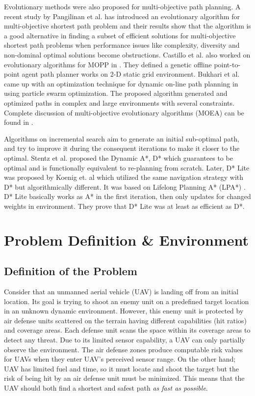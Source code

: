 \documentclass[10pt, a4paper, conference, compsocconf]{IEEEtran}
\begin{document}
Evolutionary methods were also proposed for multi-objective path planning. A recent study by Pangilinan et al. \cite{Pangilinan} has introduced an evolutionary algorithm for multi-objective shortest path problem and their results show that the algorithm is a good alternative in finding a subset of efficient solutions for multi-objective shortest path problems when performance issues like complexity, diversity and non-dominal optimal solutions become obstructions. Castillo et al. also worked on evolutionary algorithms for MOPP in \cite{Castillo:2007}. They defined a genetic offline point-to-point agent path planner works on 2-D static grid environment. Bukhari et al. came up with an optimization technique for dynamic on-line path planning in \cite{Bukhari:2010} using particle swarm optimization. The proposed algorithm generated and optimized paths in complex and large environments with several constraints. Complete discussion of multi-objective evolutionary algorithms (MOEA) can be found in \cite{MOOUEA}.

Algorithms on incremental search aim to generate an initial sub-optimal path, and try to improve it during the consequent iterations to make it closer to the optimal. Stentz et al. proposed the Dynamic A*, D* \cite{DStar:1994} which guarantees to be optimal and is functionally equivalent to re-planning from scratch. Later, D* Lite was proposed by Koenig et. al \cite{Koenig:2002} which utilized the same navigation strategy with D* but algorithmically different. It was based on Lifelong Planning A* (LPA*) \cite{LPAStarKoenig:2004}. D* Lite basically works as A* in the first iteration, then only updates for changed weights in environment. They prove that D* Lite was at least as efficient as D*. 

\section{Problem Definition \& Environment}
\subsection{Definition of the Problem}
Consider that an unmanned aerial vehicle (UAV) is landing off from an initial location. Its goal is trying to shoot an enemy unit on a predefined target location in an unknown dynamic environment. However, this enemy unit is protected by air defense units scattered on the terrain having different capabilities (hit ratios) and coverage areas. Each defense unit scans the space within its coverage areas to detect any threat. Due to its limited sensor capability, a UAV can only partially observe the environment. The air defense zones produce computable risk values for UAVs when they enter UAV's perceived sensor range. On the other hand; UAV has limited fuel and time, so it must locate and shoot the target but the risk of being hit by an air defense unit must be minimized. This means that the UAV should both find a shortest and safest path \textit{as fast as possible}. 
\end{document}
